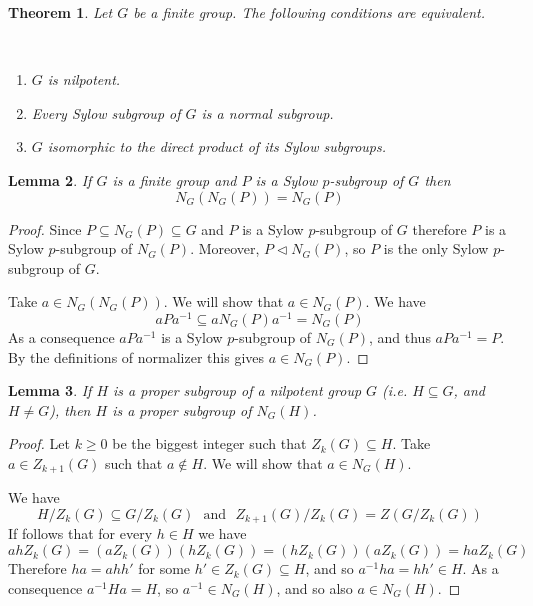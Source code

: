 \documentclass[12pt, letterpaper, oneside]{article}
\theoremstyle{plain}
\newtheorem{theorem}{Theorem}[section]
\newtheorem{lemma}[theorem]{Lemma}
\theoremstyle{definition}
\newcommand{\benu}{\begin{enumerate}}
\newcommand{\eenu}{\end{enumerate}}
\newcommand{\vs}{\vskip 5mm}
\newcommand{\isep}[1][0]{\setlength{\itemsep}{#1 mm}}
\begin{document}
\vs\vs


\begin{theorem}
\label{THM_NILPSYLOWPROD}
Let $G$ be a finite group. The following conditions are equivalent. 

\vskip -13mm

\ 
\benu
\isep 
\item $G$ is nilpotent.
\item Every Sylow subgroup of $G$ is a normal subgroup.
\item $G$ isomorphic to the direct product of its Sylow subgroups. 
\eenu
\end{theorem}


\vs\vs

\begin{lemma}
\label{LEMMA_NORMOFNORM}
If $G$ is a finite group and $P$ is a Sylow $p$-subgroup of $G$ then 
$$N_{G}(N_{G}(P)) = N_{G}(P)$$
\end{lemma}


\vs 

\begin{proof}
Since  $P\subseteq N_{G}(P)\subseteq G$ and $P$ is a Sylow $p$-subgroup of $G$ 
therefore $P$ is a Sylow $p$-subgroup of $N_{G}(P)$. Moreover, $P\lhd N_{G}(P)$, so 
$P$ is the only Sylow $p$-subgroup of $G$.

Take $a\in N_{G}(N_{G}(P))$. We will show that $a\in N_{G}(P)$. We have 
$$aPa^{-1 } \subseteq aN_{G}(P)a^{-1} = N_{G}(P)$$
As a consequence  $aPa^{-1}$ is a Sylow $p$-subgroup of $N_{G}(P)$, and thus 
$aPa^{-1} = P$. By the definitions of normalizer this gives $a\in N_{G}(P)$.
\end{proof}

\vs\vs

\begin{lemma}
\label{LEMMA_NILPPROPNORM}
If $H$ is a proper subgroup of a nilpotent group $G$ (i.e. $H\subseteq G$, and $H\neq G$), 
then $H$ is a proper subgroup of $N_{G}(H)$.
\end{lemma}

\vs

\begin{proof}
Let $k\geq 0$ be the biggest integer such that $Z_{k}(G)\subseteq H$. Take $a\in Z_{k+1}(G)$
such that $a\not\in H$. We will show that $a\in N_{G}(H)$.

We have 
$$H/Z_{k}(G) \subseteq G/Z_{k}(G) \ \ \ \text{and} \ \ \ Z_{k+1}(G)/Z_{k}(G) = Z(G/Z_{k}(G))$$
If follows that for every $h\in H$ we have 
$$ahZ_{k}(G) = (aZ_{k}(G))(hZ_{k}(G)) =  (hZ_{k}(G))(aZ_{k}(G)) = haZ_{k}(G)$$
Therefore  $ha = ahh'$ for some $h'\in Z_{k}(G)\subseteq H$, and so $a^{-1}ha = hh' \in H$. 
As a consequence $a^{-1}Ha = H$, so $a^{-1}\in N_{G}(H)$, and so also $a\in N_{G}(H)$.

 
\end{proof}
\end{document}
